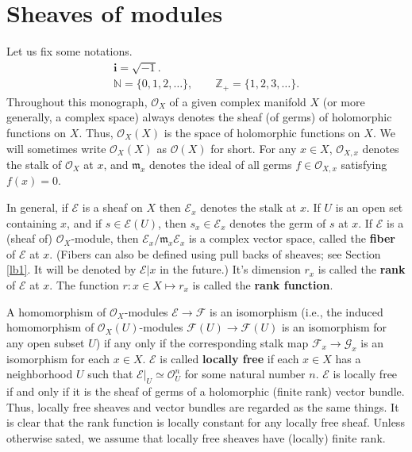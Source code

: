 \documentclass[12pt,a4paper,notitlepage]{report}
\theoremstyle{definition}
\theoremstyle{plain}
\newcommand{\fk}{\mathfrak}
\newcommand{\scr}{\mathscr}
\newcommand{\im}{\mathbf{i}}
\newcommand{\Nbb}{\mathbb N}
\newcommand{\Zbb}{\mathbb Z}
\numberwithin{equation}{section}
\begin{document}
\section{Sheaves of modules}
Let us  fix some notations.    
\begin{gather*}
\im=\sqrt{-1}.\\
\Nbb=\{0,1,2,\dots\},\qquad \Zbb_+=\{1,2,3,\dots\}.
\end{gather*}
Throughout this monograph, $\scr O_X$ of a given complex manifold $X$ (or more generally, a complex space) always denotes the sheaf (of germs) of holomorphic functions on $X$. Thus, $\scr O_X(X)$ is the space of holomorphic functions on $X$. We will sometimes write $\scr O_X(X)$ as $\scr O(X)$ for short. For any $x\in X$, $\scr O_{X,x}$ denotes the stalk of $\scr O_X$ at $x$, and $\fk m_x$ denotes the ideal of all germs $f\in\scr O_{X,x}$ satisfying $f(x)=0$. 



In general, if $\scr E$ is a sheaf on $X$ then $\scr E_x$ denotes the stalk at $x$. \index{Ex@$\scr E_x$} If $U$ is an open set containing $x$, and if $s\in\scr E(U)$, then $s_x\in\scr E_x$ denotes the germ of $s$ at $x$. \index{Ex@$\scr E_x$!$s_x$} If $\scr E$ is a (sheaf of) $\scr O_X$-module, then  $\scr E_x/\fk m_x\scr E_x$ is a complex vector space, called the \textbf{fiber} of $\scr E$ at $x$. (Fibers can also be defined using pull backs of sheaves; see Section \ref{lb1}. It will be denoted by $\scr E|x$ in the future.) \index{EX@ ${\scr E\lvert X},\scr E\lvert x$} It's dimension $r_x$ is called the \textbf{rank} of $\scr E$ at $x$. The function $r:x\in X\mapsto r_x$ is called the \textbf{rank function}.


A homomorphism of $\scr O_X$-modules $\scr E\rightarrow\scr F$ is an isomorphism (i.e., the induced homomorphism of $\scr O_X(U)$-modules $\scr F(U)\rightarrow\scr F(U)$ is an isomorphism for any open subset $U$) if any only if the corresponding stalk map $\scr F_x\rightarrow\scr G_x$ is an isomorphism for each $x\in X$. $\scr E$ is called \textbf{locally free} if  each $x\in X$ has a neighborhood $U$ such that $\scr E|_U\simeq \scr O_U^n$ for some natural number $n$. $\scr E$ is locally free if and only if it is the sheaf of germs of a holomorphic (finite rank) vector bundle. Thus, locally free sheaves and vector bundles are regarded as the same things. It is clear that the rank function is locally constant for any locally free sheaf. Unless otherwise sated, we assume that locally free sheaves  have (locally) finite rank. 
\end{document}
